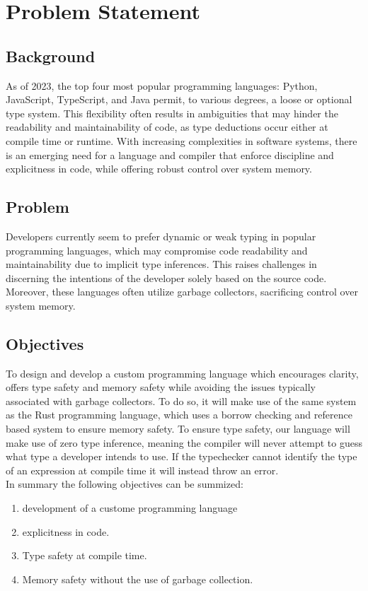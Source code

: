 \section{Problem Statement}
\label{sec:ProblemStatement}

\subsection{Background}

As of 2023, the top four most popular programming languages: Python, JavaScript,
TypeScript, and Java permit, to various degrees, a loose or optional type
system\cite{STACK}. This flexibility often results in ambiguities that may hinder the
readability and maintainability of code, as type deductions occur either at compile
time or runtime. With increasing complexities in software systems, there is an
emerging need for a language and compiler that enforce discipline and explicitness in
code, while offering robust control over system memory.

\subsection{Problem}

Developers currently seem to prefer dynamic or weak typing in popular programming
languages, which may compromise code readability and maintainability due to implicit
type inferences. This raises challenges in discerning the intentions of the developer
solely based on the source code. Moreover, these languages often utilize garbage
collectors, sacrificing control over system memory.

\subsection{Objectives}
\label{sec:Objectives}

To design and develop a custom programming language which encourages clarity, offers
type safety and memory safety while avoiding the issues typically associated with
garbage collectors. To do so, it will make use of the same system as the Rust programming
language, which uses a borrow checking and reference based system to ensure memory
safety\cite{RUST}. To ensure type safety, our language will make use of zero type
inference, meaning the compiler will never attempt to guess what type a developer
intends to use. If the typechecker cannot identify the type of an expression at
compile time it will instead throw an error. \\

In summary the following objectives can be summized:

\begin{enumerate}
  \item development of a custome programming language
  \item explicitness in code.
  \item Type safety at compile time.
  \item Memory safety without the use of garbage collection.
\end{enumerate}
